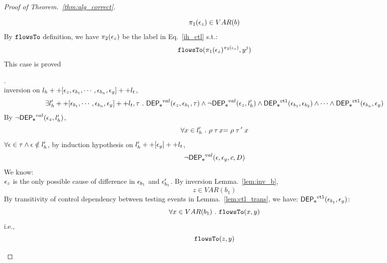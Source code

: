 \documentclass[a4paper,11pt]{article}
\begin{document}
\begin{proof}[Proof of Theorem.~\ref{thm:alg_correct}]
\begin{case}
\begin{subcase}
\[
  \pi_1(\mathtt{\epsilon}_z) \in VAR(b)
\]
%
By $\mathtt{flowsTo}$ definition, we have $\pi_2(\mathtt{\epsilon}_z)$ be the label in Eq.~\ref{ih_ctl} s.t.:
\[
  \mathtt{flowsTo}(\pi_1(\mathtt{\epsilon}_z)^{\pi_2(\mathtt{\epsilon}_z)}, y^j)
\]
%
This case is proved
%
%
\end{subcase}
%
\begin{subcase}.
\\
inversion on  $l_h ++ {[\mathtt{\epsilon}_z,  \mathtt{\epsilon}_{b_1}, \cdots, \mathtt{\epsilon}_{b_n},\mathtt{\epsilon}_y]} ++ l_t$, 
\[
  \exists l_{h}' ++ [ \mathtt{\epsilon}_{b_1}, \cdots, \mathtt{\epsilon}_{b_n}, \mathtt{\epsilon}_y] ++ l_t, \mathtt{\tau} ~.~
  \mathsf{DEP_{\mathtt{e}}}^{val}(\mathtt{\epsilon}_z, \mathtt{\epsilon}_{b_1}, \mathtt{\tau})
  \land 
  \neg \mathsf{DEP_{\mathtt{e}}}^{val} (\mathtt{\epsilon}_z, l_h')
  \land 
  \mathsf{DEP_{\mathtt{e}}}^{\mathtt{{ctl}}} (\mathtt{\epsilon}_{b_1}, \mathtt{\epsilon}_{b_2})
  \land 
  \cdots
  \land 
  \mathsf{DEP_{\mathtt{e}}}^{\mathtt{{ctl}}} (\mathtt{\epsilon}_{b_n}, \mathtt{\epsilon}_y)
\]
%
By $\neg \mathsf{DEP_{\mathtt{e}}}^{val} (\mathtt{\epsilon}_z, l_h')$, 
\[
  \forall x \in l_h' ~.~
  \rho \mathrel{ {\mathtt{\tau}} \, {x} } = \rho \mathrel{ {\mathtt{\tau}} \, {'} } x
\]
%
$\forall \mathtt{\epsilon} \in \mathtt{\tau} \land \mathtt{\epsilon} \notin l_h'$, by induction hypothesis on $l_{h}' ++ [\mathtt{\epsilon}_y] ++ l_t$, 
\[
  \neg \mathsf{DEP_{\mathtt{e}}}^{val} (\mathtt{\epsilon}, \mathtt{\epsilon}_y, c, D)
\]
%
We know:
\\
%
$\mathtt{\epsilon}_z$ is the only possible cause of difference in $\mathtt{\epsilon}_{b_1}$ and $\mathtt{\epsilon}_{b_1}'$.
%
By inversion Lemma.~\ref{lem:inv_b}, 
\[
  z \in VAR(b_1)
\]
%
%
By transitivity of control dependency between testing events in Lemma.~\ref{lem:ctl_trans},
we have:
 $ \mathsf{DEP_{\mathtt{e}}}^{\mathtt{{ctl}}} (\mathtt{\epsilon}_{b_1}, \mathtt{\epsilon}_y)$:
\[
  \forall x \in VAR(b_1) ~.~ \mathtt{flowsTo}(x, y)
\]
i.e.,
\[
  \mathtt{flowsTo}(z, y)
\]
%
\end{subcase}
%
\end{case}
%
\end{proof}
\end{document}
